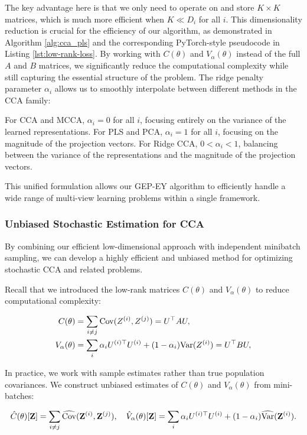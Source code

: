 The key advantage here is that we only need to operate on and store $K \times K$ matrices, which is much more efficient when $K \ll D_i$ for all $i$. This dimensionality reduction is crucial for the efficiency of our algorithm, as demonstrated in Algorithm \ref{alg:cca_pls} and the corresponding PyTorch-style pseudocode in Listing \ref{lst:low-rank-loss}.
By working with $C(\theta)$ and $V_\alpha(\theta)$ instead of the full $A$ and $B$ matrices, we significantly reduce the computational complexity while still capturing the essential structure of the problem. The ridge penalty parameter $\alpha_i$ allows us to smoothly interpolate between different methods in the CCA family:

For CCA and MCCA, $\alpha_i = 0$ for all $i$, focusing entirely on the variance of the learned representations.
For PLS and PCA, $\alpha_i = 1$ for all $i$, focusing on the magnitude of the projection vectors.
For Ridge CCA, $0 < \alpha_i < 1$, balancing between the variance of the representations and the magnitude of the projection vectors.

This unified formulation allows our GEP-EY algorithm to efficiently handle a wide range of multi-view learning problems within a single framework.
\subsubsection{Unbiased Stochastic Estimation for CCA}

By combining our efficient low-dimensional approach with independent minibatch sampling, we can develop a highly efficient and unbiased method for optimizing stochastic CCA and related problems.

Recall that we introduced the low-rank matrices $C(\theta)$ and $V_\alpha(\theta)$ to reduce computational complexity:

\begin{align}\label{eq:def-C-V-matrices}
C(\theta) &= \sum_{i \neq j} \mathrm{Cov}(Z^{(i)}, Z^{(j)}) = U^\top A U, \\
V_\alpha(\theta) &= \sum_i \alpha_i U^{(i)\top} U^{(i)} + (1 - \alpha_i) \mathrm{Var}(Z^{(i)}) = U^\top B U,
\end{align}

In practice, we work with sample estimates rather than true population covariances. We construct unbiased estimates of $C(\theta)$ and $V_\alpha(\theta)$ from mini-batches:

\begin{align}\label{eq:def-C-V-matrices-empirical}
\hat{C}(\theta)[\mathbf{Z}] = \sum_{i \neq j} \widehat{\mathrm{Cov}}(\mathbf{Z}^{(i)}, \mathbf{Z}^{(j)}), \quad
\hat{V}_\alpha(\theta)[\mathbf{Z}] = \sum_{i} \alpha_i U^{(i)\top} U^{(i)} + (1 - \alpha_i) \widehat{\mathrm{Var}}(\mathbf{Z}^{(i)}).
\end{align}

